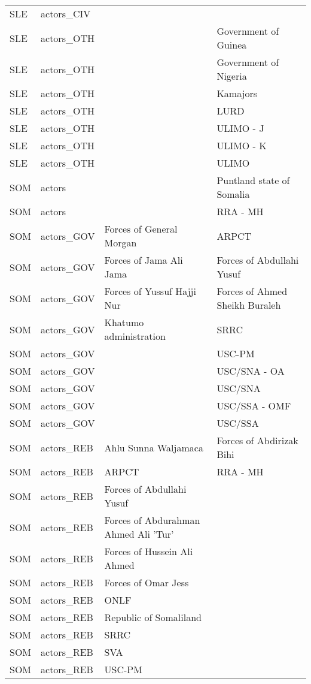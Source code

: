 \begin{table}[ht]
\begin{tabular}{llll}
  SLE & actors\_CIV &  &  \\ 
  SLE & actors\_OTH &  & Government of Guinea \\ 
  SLE & actors\_OTH &  & Government of Nigeria \\ 
  SLE & actors\_OTH &  & Kamajors \\ 
  SLE & actors\_OTH &  & LURD \\ 
  SLE & actors\_OTH &  & ULIMO - J \\ 
  SLE & actors\_OTH &  & ULIMO - K \\ 
  SLE & actors\_OTH &  & ULIMO \\ 
  SOM & actors &  & Puntland state of Somalia \\ 
  SOM & actors &  & RRA - MH \\ 
  SOM & actors\_GOV & Forces of General Morgan & ARPCT \\ 
  SOM & actors\_GOV & Forces of Jama Ali Jama & Forces of Abdullahi Yusuf \\ 
  SOM & actors\_GOV & Forces of Yussuf Hajji Nur & Forces of Ahmed Sheikh Buraleh \\ 
  SOM & actors\_GOV & Khatumo administration & SRRC \\ 
  SOM & actors\_GOV &  & USC-PM \\ 
  SOM & actors\_GOV &  & USC/SNA - OA \\ 
  SOM & actors\_GOV &  & USC/SNA \\ 
  SOM & actors\_GOV &  & USC/SSA - OMF \\ 
  SOM & actors\_GOV &  & USC/SSA \\ 
  SOM & actors\_REB & Ahlu Sunna Waljamaca & Forces of Abdirizak Bihi \\ 
  SOM & actors\_REB & ARPCT & RRA - MH \\ 
  SOM & actors\_REB & Forces of Abdullahi Yusuf &  \\ 
  SOM & actors\_REB & Forces of Abdurahman Ahmed Ali 'Tur' &  \\ 
  SOM & actors\_REB & Forces of Hussein Ali Ahmed &  \\ 
  SOM & actors\_REB & Forces of Omar Jess &  \\ 
  SOM & actors\_REB & ONLF &  \\ 
  SOM & actors\_REB & Republic of Somaliland &  \\ 
  SOM & actors\_REB & SRRC &  \\ 
  SOM & actors\_REB & SVA &  \\ 
  SOM & actors\_REB & USC-PM &  \\ 

\end{tabular}
\end{table}
